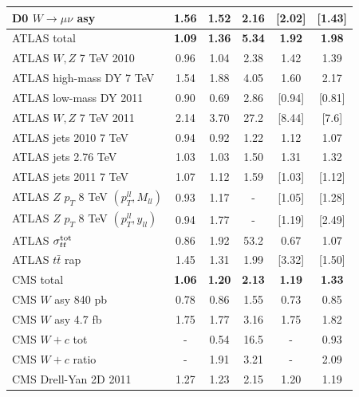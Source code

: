 \begin{table}[h]
\begin{center}
\begin{tabular}{|l|c|c|c||c|c|}
D0 $W\to \mu\nu$  asy    &    1.56      &   1.52   &    2.16          &   [2.02]   &   [1.43]  \\    
\hline
\hline
ATLAS total   &    {\bf 1.09}      &   {\bf 1.36}   &    {\bf 5.34}         &   {\bf 1.92 }  & {\bf 1.98}  \\    
ATLAS $W,Z$ 7 TeV 2010    &    0.96     &   1.04   &    2.38         &   1.42   &   1.39  \\    
ATLAS high-mass DY 7 TeV    &    1.54     &   1.88   &   4.05         &   1.60   &   2.17  \\    
ATLAS low-mass DY 2011    &    0.90      &   0.69   &   2.86         &   [0.94]   &   [0.81]  \\    
ATLAS $W,Z$ 7 TeV 2011    &    2.14     &   3.70   &    27.2       &   [8.44]   &   [7.6]  \\    
ATLAS jets 2010 7 TeV     &    0.94      &   0.92   &  1.22        &   1.12   &   1.07  \\    
ATLAS jets 2.76 TeV     &    1.03      &   1.03   &     1.50     &   1.31   &   1.32  \\    
ATLAS jets 2011 7 TeV     &    1.07     &   1.12   &   1.59       &   [1.03]   &   [1.12]  \\    
ATLAS $Z$ $p_T$ 8 TeV $(p_T^{ll},M_{ll})$       &    0.93    &   1.17   &   -         &   [1.05]  &  [1.28]  \\    
ATLAS $Z$ $p_T$ 8 TeV $(p_T^{ll},y_{ll})$    &    0.94      &   1.77   &   -         &   [1.19]   &   [2.49]  \\    
ATLAS $\sigma_{tt}^{\rm tot}$     &    0.86      &   1.92   &  53.2           &   0.67   &   1.07  \\    
ATLAS $t\bar{t}$ rap    &    1.45     &   1.31   &  1.99       &   [3.32]   &   [1.50]  \\
\hline
CMS total   &   {\bf  1.06}    &   {\bf 1.20 }  &    {\bf 2.13}        &   {\bf 1.19 }  &
{\bf 1.33}  \\    
CMS $W$ asy 840 pb     &    0.78     &   0.86   &    1.55       &   0.73   &   0.85  \\    
CMS $W$ asy 4.7 fb     &    1.75     &   1.77   &   3.16      &   1.75   &   1.82  \\    
CMS $W+c$ tot    &    -     &   0.54   &    16.5          &   -   &   0.93  \\    
CMS $W+c$ ratio    &    -      &   1.91   &    3.21         &   -   &   2.09  \\    
CMS Drell-Yan 2D 2011    &    1.27     &   1.23   &  2.15           &   1.20   &   1.19  \\    

\end{tabular}
\end{center}
\end{table}
